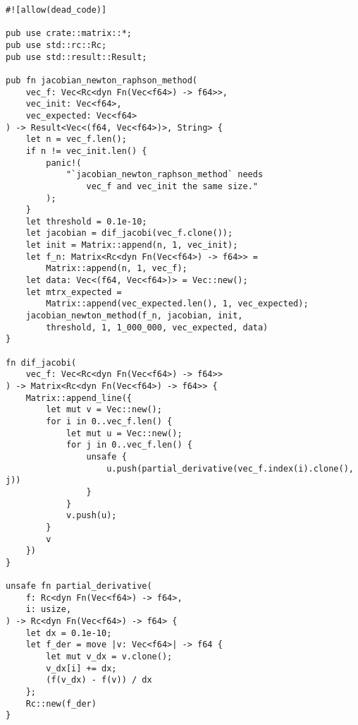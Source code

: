 \documentclass[uplatex, 11pt,a4j, titlepage]{jsarticle}
\begin{document}
\begin{lstlisting}[caption={newton\_raphson\_method.rs}]
#![allow(dead_code)]

pub use crate::matrix::*;
pub use std::rc::Rc;
pub use std::result::Result;
    
pub fn jacobian_newton_raphson_method(
    vec_f: Vec<Rc<dyn Fn(Vec<f64>) -> f64>>,
    vec_init: Vec<f64>,
    vec_expected: Vec<f64>
) -> Result<Vec<(f64, Vec<f64>)>, String> {
    let n = vec_f.len();
    if n != vec_init.len() {
        panic!(
            "`jacobian_newton_raphson_method` needs 
                vec_f and vec_init the same size."
        );
    }
    let threshold = 0.1e-10;
    let jacobian = dif_jacobi(vec_f.clone());
    let init = Matrix::append(n, 1, vec_init);
    let f_n: Matrix<Rc<dyn Fn(Vec<f64>) -> f64>> = 
        Matrix::append(n, 1, vec_f);
    let data: Vec<(f64, Vec<f64>)> = Vec::new();
    let mtrx_expected = 
        Matrix::append(vec_expected.len(), 1, vec_expected);
    jacobian_newton_method(f_n, jacobian, init, 
        threshold, 1, 1_000_000, vec_expected, data)
}
    
fn dif_jacobi(
    vec_f: Vec<Rc<dyn Fn(Vec<f64>) -> f64>>
) -> Matrix<Rc<dyn Fn(Vec<f64>) -> f64>> {
    Matrix::append_line({
        let mut v = Vec::new();
        for i in 0..vec_f.len() {
            let mut u = Vec::new();
            for j in 0..vec_f.len() {
                unsafe { 
                    u.push(partial_derivative(vec_f.index(i).clone(), j)) 
                }
            }
            v.push(u);
        }
        v
    })
}
    
unsafe fn partial_derivative(
    f: Rc<dyn Fn(Vec<f64>) -> f64>,
    i: usize,
) -> Rc<dyn Fn(Vec<f64>) -> f64> {
    let dx = 0.1e-10;
    let f_der = move |v: Vec<f64>| -> f64 {
        let mut v_dx = v.clone();
        v_dx[i] += dx;
        (f(v_dx) - f(v)) / dx
    };
    Rc::new(f_der)
}
    

\end{lstlisting}
\end{document}
